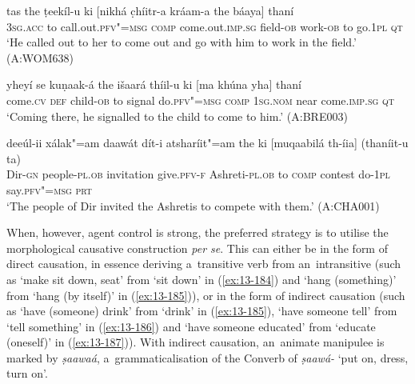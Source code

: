 \begin{exe}
\ex
\label{ex:13-181}
\gll tas the ṭeekíl-u ki [nikhá c̣híitr-a  kráam-a the báaya] thaní \\
\textsc{3sg.acc} to call.out.\textsc{pfv"=msg} \textsc{comp} come.out.\textsc{imp.sg} field-\textsc{ob}  work-\textsc{ob} to go.\textsc{1pl} \textsc{qt} \\
\glt `He called out to her to come out and go with him to work in the field.' (A:WOM638)

\ex
\label{ex:13-182}
\gll yheyí se kuṇaak-á the išaará thíil-u  ki [ma khúna yha] thaní \\
come.\textsc{cv} \textsc{def} child-\textsc{ob} to signal do.\textsc{pfv"=msg} \textsc{comp} \textsc{1sg.nom} near come.\textsc{imp.sg} \textsc{qt} \\
\glt `Coming there, he signalled to the child to come to him.' (A:BRE003)

\ex
\label{ex:13-183}
\gll deeúl-ii xálak"=am daawát dít-i  atsharíit"=am the ki [muqaabilá
  th-íia]  (thaníit-u ta) \\
Dir-\textsc{gn}  people-\textsc{pl.ob} invitation give.\textsc{pfv-f} Ashreti-\textsc{pl.ob} to \textsc{comp} contest do-\textsc{1pl} say.\textsc{pfv"=msg} \textsc{prt} \\
\glt `The people of Dir invited the Ashretis to compete with them.' (A:CHA001) 
\end{exe}

When, however, agent control is strong, the preferred strategy is to utilise the morphological causative construction \textit{per se}. This can either be in the form of direct causation, in essence deriving a~transitive verb from an~intransitive (such as `make sit down, seat' from `sit down' in (\ref{ex:13-184}) and `hang (something)' from `hang (by itself)' in (\ref{ex:13-185})), or in the form of indirect causation (such as `have (someone) drink' from `drink' in (\ref{ex:13-185}), `have someone tell' from `tell something' in (\ref{ex:13-186}) and `have someone educated' from `educate (oneself)' in (\ref{ex:13-187})). With indirect causation, an~animate manipulee is marked by \textit{ṣaawaá}, a~grammaticalisation of the Converb of \textit{ṣaawá-} `put on, dress, turn on'.


